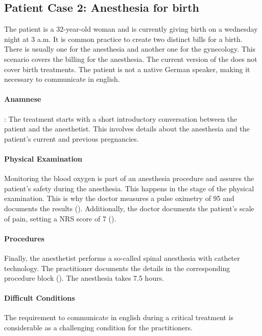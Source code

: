 \subsection{Patient Case 2: Anesthesia for birth}\label{subsec:patient-case-2:-anesthesia-for-birth}
The patient is a 32-year-old woman and is currently giving birth on a wednesday night at 3 a.m.
It is common practice to create two distinct bills for a birth.
There is usually one for the anesthesia and another one for the gynecology.
This scenario covers the billing for the anesthesia.
The current version of the \AVS does not cover birth treatments.
The patient is not a native German speaker, making it necessary to communicate in english.

\paragraph{Anamnese}:
The treatment starts with a short introductory conversation between the patient and the anesthetist.
This involves details about the anesthesia and the patient's current and previous pregnancies.

\paragraph{Physical Examination}
Monitoring the blood oxygen is part of an anesthesia procedure and assures the patient's safety during the anesthesia.
This happens in the stage of the physical examination.
This is why the doctor measures a pulse oximetry of 95 and documents the results ().
Additionally, the doctor documents the patient's scale of pain, setting a NRS score of 7 ().

\paragraph{Procedures}
Finally, the anesthetist performs a so-called spinal anesthesia with catheter technology.
The practitioner documents the details in the corresponding procedure block ().
The anesthesia takes 7.5 hours.

\paragraph{Difficult Conditions}
The requirement to communicate in english during a critical treatment is considerable as a challenging condition for the practitioners.

